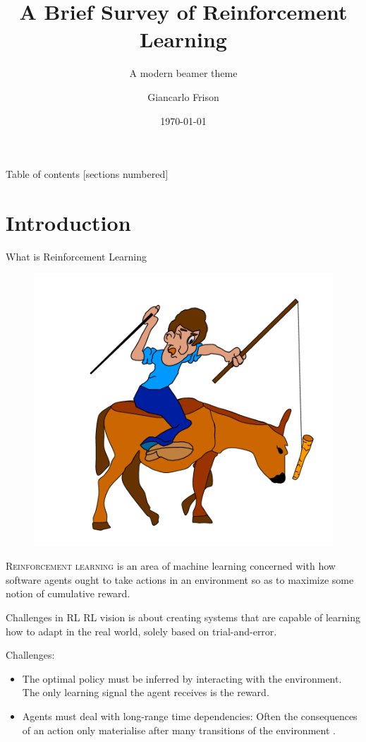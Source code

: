\documentclass[10pt]{beamer}
\title{A Brief Survey of Reinforcement Learning}
\subtitle{A modern beamer theme}
\date{\today}
\author{Giancarlo Frison}
\begin{document}

\maketitle

\begin{frame}{Table of contents}
  [sections numbered]
  \tableofcontents[hideallsubsections]
\end{frame}

\section{Introduction}
\begin{frame}[fragile]{What is Reinforcement Learning}
	\begin{figure}[t!]	
	\centering
	\includegraphics[scale=0.3]{img/donkey.png}
	\cite{donkey}
	\end{figure}
	\textsc{Reinforcement learning} is an area of machine learning concerned with how software agents ought to take actions in an environment so as to maximize some notion of cumulative reward.
\end{frame}

\begin{frame}[fragile]{Challenges in RL}
	RL  vision  is about creating  systems that  are  capable  of  learning  how  to  adapt  in  the  real  world, solely based on trial-and-error.
	
	Challenges:
	\begin{itemize}
		\item The  optimal  policy  must  be  inferred  by  interacting with the environment. The only learning signal
the agent receives is the reward.
		\item Agents  must  deal  with  long-range  time  dependencies:
Often the consequences of an action only materialise after
many transitions of the environment \cite{Montague1999}.
	\end{itemize}
\end{frame}
\end{document}
